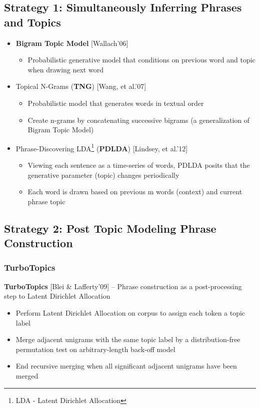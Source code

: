 \subsection{Strategy 1: Simultaneously Inferring Phrases and Topics}
\begin{itemize}
\item \textbf{Bigram Topic Model} [Wallach’06]
    \begin{itemize}
    \item Probabilistic generative model that conditions on previous word and topic when drawing next word
    \end{itemize}

\item Topical N-Grams (\textbf{TNG}) [Wang, et al.’07]
    \begin{itemize}
    \item Probabilistic model that generates words in textual order
    \item Create n-grams by concatenating successive bigrams (a generalization of Bigram Topic Model)
    \end{itemize}

\item Phrase-Discovering LDA\footnote{LDA - Latent Dirichlet Allocation} (\textbf{PDLDA}) [Lindsey, et al.’12]
    \begin{itemize}
    \item Viewing each sentence as a time-series of words, PDLDA posits that the generative parameter (topic) changes periodically
    \item Each word is drawn based on previous m words (context) and current phrase topic
    \end{itemize}
\end{itemize}  

\subsection{Strategy 2: Post Topic Modeling Phrase Construction} 

\subsubsection{TurboTopics}

\textbf{TurboTopics} [Blei \& Lafferty’09] – Phrase construction as a post-processing step to Latent Dirichlet Allocation
\begin{itemize}
\item Perform Latent Dirichlet Allocation on corpus to assign each token a topic label
\item Merge adjacent unigrams with the same topic label by a distribution-free
permutation test on arbitrary-length back-off model
\item End recursive merging when all significant adjacent unigrams have been merged
\end{itemize}

